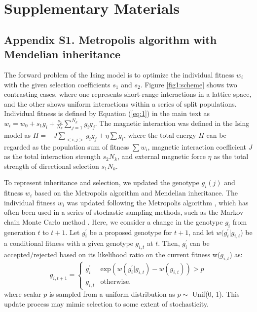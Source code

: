 \documentclass[12pt,]{article}
\newcommand{\beginsupplement}{%
        \setcounter{table}{0}
        \renewcommand{\thetable}{S\arabic{table}}%
        \setcounter{figure}{0}
        \renewcommand{\thefigure}{S\arabic{figure}}%
        \setcounter{equation}{0}
        \renewcommand{\theequation}{S\arabic{equation}}
     }
\begin{document}
\clearpage

\section*{Supplementary Materials}
\beginsupplement

\medskip

\subsection*{Appendix S1. Metropolis algorithm with Mendelian inheritance}
The forward problem of the Ising model is to optimize the individual fitness $w_i$ with the given selection coefficients $s_1$ and $s_2$. Figure \ref{fig1:scheme} shows two contrasting cases, where one represents short-range interactions in a lattice space, and the other shows uniform interactions within a series of split populations. Individual fitness is defined by Equation (\ref{eq:1}) in the main text as $w_i = w_0 + s_1 g_i + \frac{s_2}{N_k}\sum^{N_{k}}_{j=1}{g_ig_j}$. The magnetic interaction was defined in the Ising model as $H = -J\sum_{<i,j>}{g_ig_j} + \eta\sum{g_i}$, where the total energy $H$ can be regarded as the population sum of fitness $\sum{w_i}$, magnetic interaction coefficient $J$ as the total interaction strength $s_2N_k$, and external magnetic force $\eta$ as the total strength of directional selection $s_1N_k$.

To represent inheritance and selection, we updated the genotype $g_i(j)$ and fitness $w_i$ based on the Metropolis algorithm and Mendelian inheritance. The individual fitness $w_i$ was updated following the Metropolis algorithm \citep{metropolis1953equation}, which has often been used in a series of stochastic sampling methods, such as the Markov chain Monte Carlo method \citep{bishop2006_11}. Here, we consider a change in the genotype $g_i$ from generation $t$ to $t+1$. Let $g^\prime_i$ be a proposed genotype for $t+1$, and let $w(g^\prime_i$|$g_{i,t}$) be a conditional fitness with a given genotype $g_{i,t}$ at $t$. Then, $g^\prime_i$ can be accepted/rejected based on its likelihood ratio on the current fitness w($g_{i,t}$) as:
\[
  g_{i,t+1} = \begin{cases}
    g_i^\prime & \mathrm{exp}(w(g^\prime_i|g_{i,t}) - w(g_{i,t})) > p \\
    g_{i,t} & \mathrm{otherwise.}
  \end{cases}
\]
where scalar $p$ is sampled from a uniform distribution as $p \sim$ Unif(0, 1). This update process may mimic selection to some extent of stochasticity.
\end{document}
